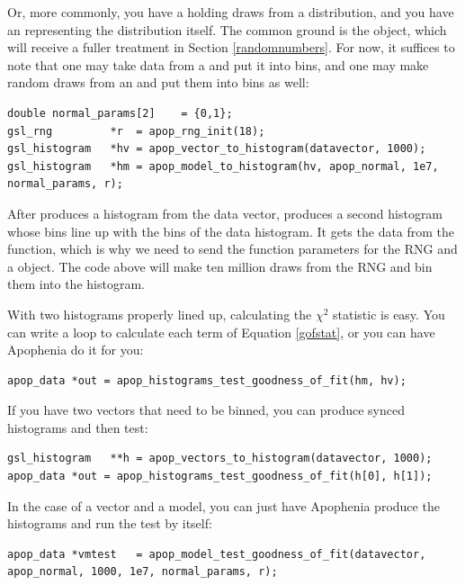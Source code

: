 Or, more commonly, you have a  holding
draws from a distribution, and you have an 
representing the distribution itself. The common ground is the
 object, which will receive a fuller treatment in
Section \ref{randomnumbers}. For now, it suffices to note that one may
take data from a  and put it into bins, and one may make
random draws from an  and put them into bins as well: 
\begin{lstlisting}
double normal_params[2]    = {0,1};
gsl_rng         *r  = apop_rng_init(18);
gsl_histogram   *hv = apop_vector_to_histogram(datavector, 1000);
gsl_histogram   *hm = apop_model_to_histogram(hv, apop_normal, 1e7, normal_params, r);
\end{lstlisting}

After  produces a histogram from the
data vector,  produces a second histogram
whose bins line up with the bins of the data histogram. It gets the data
from the  function, which is why we need to
send the function parameters for the RNG and a 
object. The code above will make ten million draws from the RNG and bin
them into the  histogram.

With two histograms properly lined up, calculating the $\chi^2$
statistic is easy. You can write a  loop to calculate each
term of Equation \ref{gofstat}, or you can have Apophenia do it for you:
\begin{lstlisting}
apop_data *out = apop_histograms_test_goodness_of_fit(hm, hv);
\end{lstlisting}

If you have two vectors that need to be binned, you can produce 
synced histograms and then test:
\begin{lstlisting}
gsl_histogram   **h = apop_vectors_to_histogram(datavector, 1000);
apop_data *out = apop_histograms_test_goodness_of_fit(h[0], h[1]);
\end{lstlisting}
In the case of a vector and a model, you can just have
Apophenia produce the histograms and run the test by itself:
\begin{lstlisting}
apop_data *vmtest   = apop_model_test_goodness_of_fit(datavector, apop_normal, 1000, 1e7, normal_params, r);
\end{lstlisting}

